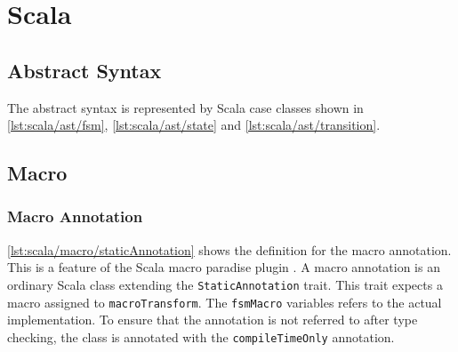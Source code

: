 \section{Scala}
\label{s:scala}
\lstset{language=scala}

\subsection{Abstract Syntax}
\label{ss:scala/abstractSyntax}

The abstract syntax is represented by Scala case classes shown in \autoref{lst:scala/ast/fsm}, \autoref{lst:scala/ast/state} and \autoref{lst:scala/ast/transition}.







\subsection{Macro}

\subsubsection{Macro Annotation}

\autoref{lst:scala/macro/staticAnnotation} shows the definition for the macro annotation.
This is a feature of the Scala macro paradise plugin \cite{scalamacroparadise}.
A macro annotation is an ordinary Scala class extending the \lstinline{StaticAnnotation} trait.
This trait expects a macro assigned to \lstinline{macroTransform}.
The \lstinline{fsmMacro} variables refers to the actual implementation.
To ensure that the annotation is not referred to after type checking, the class is annotated with the \lstinline{compileTimeOnly} annotation.



